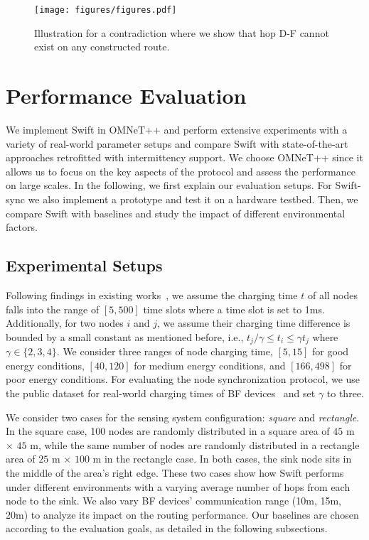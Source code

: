 \documentclass[lettersize,journal]{IEEEtran}
\newcommand{\ours}{Swift\xspace}
\begin{document}
\begin{figure}[!t]
    \centering
    \texttt{[image: figures/figures.pdf]}
    \caption{Illustration for a contradiction where we show that hop D-F cannot exist on any constructed route.}
    \label{fig:route:proof}
\end{figure}




\section{Performance Evaluation}
\label{sec:eval}
We implement \ours in OMNeT++ and perform extensive experiments with a variety of real-world parameter setups and compare \ours with state-of-the-art approaches retrofitted with intermittency support. We choose OMNeT++ since it allows us to focus on the key aspects of the protocol and assess the performance on large scales. In the following, we first explain our evaluation setups.
For \ours-sync we also implement a prototype and test it on a hardware testbed.
Then, we compare \ours with baselines and study the impact of different environmental factors.

\subsection{Experimental Setups}
Following findings in existing works~\cite{2021-nsdi-find,2022-nsdi-bonito}, we assume the charging time $t$ of all  nodes falls into the range of $[5, 500]$ time slots where a time slot is set to 1ms. Additionally, for two nodes $i$ and $j$, we assume their charging time difference is bounded by a small constant as mentioned before, i.e., $t_j/\gamma \leq t_i \leq \gamma t_j$ where $\gamma \in \{2,3,4\}$. We consider three ranges of node charging time, $[5,15]$ for good energy conditions, $[40,120]$ for medium energy conditions, and $[166,498]$ for poor energy conditions. For evaluating the node synchronization protocol, we use the public dataset for real-world charging times of BF devices~\cite{2021-nsdi-find} and set $\gamma$ to three. 

We consider two cases for the sensing system configuration: \emph{square} and \emph{rectangle}. In the square case, 100 nodes are randomly distributed in a square area of $45$ m $\times$ $45$ m, while the same number of nodes are randomly distributed in a rectangle area of $25$ m $\times$ $100$ m in the rectangle case. In both cases, the sink node sits in the middle of the area's right edge. These two cases show how \ours performs under different environments with a varying average number of hops from each node to the sink. We also vary BF devices' communication range (10m, 15m, 20m) to analyze its impact on the routing performance. Our baselines are chosen according to the evaluation goals, as detailed in the following subsections.
\end{document}
